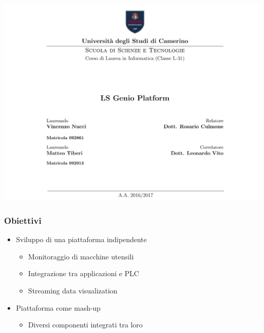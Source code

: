 \documentclass{beamer}
\date{}
\begin{document}
	
	\begin{frame}
	\centering
	\includegraphics[scale=0.25]{images/frontespizio-beamer.png}\par
\end{frame}

\begin{frame}
\frametitle{Obiettivi}
\begin{itemize}
	\item Sviluppo di una piattaforma indipendente
	\begin{itemize}
		\item Monitoraggio di macchine utensili
		\item Integrazione tra applicazioni e PLC
		\item Streaming data visualization
	\end{itemize}
	\item Piattaforma come mash-up
	\begin{itemize}
		\item Diversi componenti integrati tra loro
	\end{itemize}
\end{itemize}
\end{frame}
\end{document}
